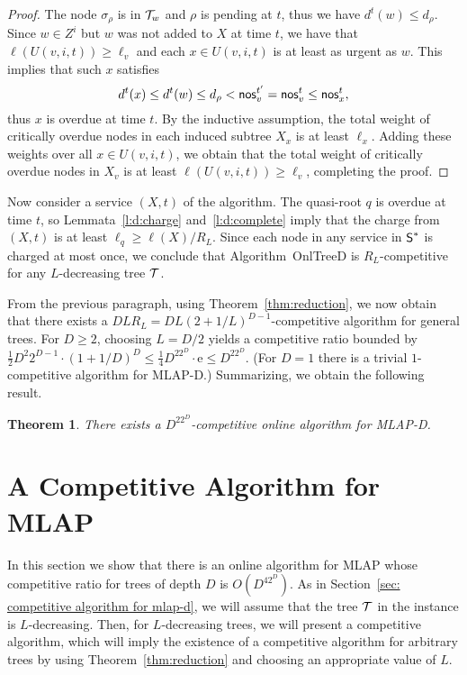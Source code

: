 \documentclass[a4paper]{article}
\newtheorem{theorem}{Theorem}[section]
\newcommand{\calT}{{\cal T}}
\newcommand{\e}{\mathrm{e}}
\newcommand{\length}{\ell}
\newcommand{\half}{{\mbox{$\frac{1}{2}$}}}
\newcommand{\OnAlgTreesDeadlines}{{\sc OnlTreeD}}
\newcommand{\MLAP}{\mbox{\rm\textsf{MLAP}}}
\newcommand{\MLAPD}{\mbox{\rm\textsf{MLAP-D}}}
\newcommand{\optschedS}{\mbox{\rm\textsf{S}}^\ast}
\newcommand{\trignode}{\sigma}
\newcommand{\advtrans}{\mbox{\rm\textsf{nos}}}
\newcommand{\onefourth}{{\textstyle\frac{1}{4}}}
\begin{document}
\begin{proof}
The node $\trignode_\rho$ is in $\calT_w$ and $\rho$ is pending at
$t$, thus we have $d^t(w)\leq d_\rho$.  Since $w \in Z^i$ but $w$ was
not added to $X$ at time $t$, we have that $\length(U(v,i,t))\geq
\length_v$ and each $x\in U(v,i,t)$ is at least as urgent as $w$.
This implies that such $x$ satisfies
\begin{equation*}
 d^t(x)\leq d^t(w) \le d_\rho<\advtrans^{t'}_v=\advtrans^t_v\leq\advtrans^t_x,
\end{equation*}
thus $x$ is overdue at time $t$. By the inductive assumption, the
total weight of critically overdue nodes in each induced 
subtree $X_x$ is at
least $\length_x$. Adding these weights over all $x\in U(v,i,t)$,
we obtain that the total weight of critically overdue nodes in $X_v$ is at
least $\length( U(v,i,t))\geq \length_v$, completing the proof.
\end{proof}

Now consider a service $(X,t)$ of the algorithm. The quasi-root $q$ is
overdue at time $t$, so Lemmata~\ref{l:d:charge} and~\ref{l:d:complete}
imply that the charge from $(X,t)$ is at least
$\length_q\ge \length(X)/R_L$. Since
each node in any service in $\optschedS$ is charged at most once, we
conclude that Algorithm~{\OnAlgTreesDeadlines} is $R_L$-competitive for any
$L$-decreasing tree $\calT$.

From the previous paragraph, using Theorem~\ref{thm:reduction}, we now
obtain that there exists a $DLR_L = DL(2+1/L)^{D-1}$-competitive
algorithm for general trees. For $D\ge 2$, choosing $L=D/2$ yields a competitive
ratio bounded by
$
\half D^2 2^{D-1}\cdot  (1+1/D)^D
		\leq \onefourth D^22^D\cdot \e
		\leq D^22^D
$.
(For $D=1$ there is a trivial $1$-competitive algorithm for {\MLAPD}.)
Summarizing, we obtain the following result. 

\begin{theorem}
There exists a $D^22^D$-competitive online algorithm for {\MLAPD}.
\end{theorem}



\section{A Competitive Algorithm for {\MLAP}}
\label{sec: competitive algorithm for mlap}


In this section we show that there is an online algorithm for {\MLAP} 
whose competitive ratio for trees of depth $D$ is $O(D^42^D)$. 
As in Section~\ref{sec: competitive algorithm for mlap-d}, we will
assume that the tree $\calT$ in the instance is $L$-decreasing.
Then, for $L$-decreasing trees, we will present a competitive algorithm,
which will imply the existence of a competitive algorithm for
arbitrary trees by using Theorem~\ref{thm:reduction}
and choosing an appropriate value of $L$.
\end{document}
